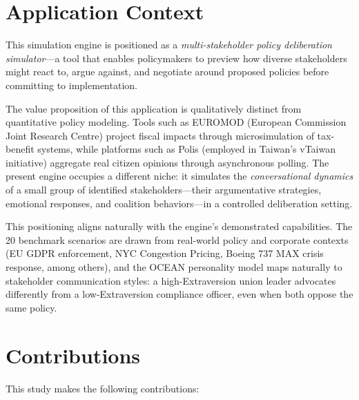 \section{Application Context}

This simulation engine is positioned as a \textit{multi-stakeholder policy deliberation simulator}---a tool that enables policymakers to preview how diverse stakeholders might react to, argue against, and negotiate around proposed policies before committing to implementation.

The value proposition of this application is qualitatively distinct from quantitative policy modeling. Tools such as EUROMOD (European Commission Joint Research Centre) project fiscal impacts through microsimulation of tax-benefit systems, while platforms such as Polis (employed in Taiwan's vTaiwan initiative) aggregate real citizen opinions through asynchronous polling. The present engine occupies a different niche: it simulates the \textit{conversational dynamics} of a small group of identified stakeholders---their argumentative strategies, emotional responses, and coalition behaviors---in a controlled deliberation setting.

This positioning aligns naturally with the engine's demonstrated capabilities. The 20 benchmark scenarios are drawn from real-world policy and corporate contexts (EU GDPR enforcement, NYC Congestion Pricing, Boeing 737 MAX crisis response, among others), and the OCEAN personality model maps naturally to stakeholder communication styles: a high-Extraversion union leader advocates differently from a low-Extraversion compliance officer, even when both oppose the same policy.


\section{Contributions}

This study makes the following contributions:

